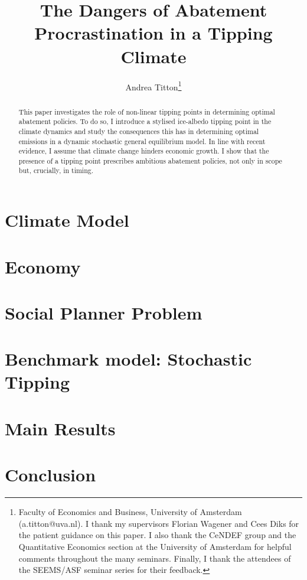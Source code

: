 \documentclass[11pt]{article}
\author{Andrea Titton\thanks{
      Faculty of Economics and Business, University of Amsterdam (a.titton@uva.nl). I thank my supervisors Florian Wagener and Cees Diks for the patient guidance on this paper. I also thank the CeNDEF group and the Quantitative Economics section at the University of Amsterdam for helpful comments throughout the many seminars. Finally, I thank the attendees of the SEEMS/ASF seminar series for their feedback.
    }}
\title{The Dangers of Abatement Procrastination in a Tipping Climate}
\begin{document}
\maketitle

\begin{abstract}
  This paper investigates the role of non-linear tipping points in determining optimal abatement policies. To do so, I introduce a stylised ice-albedo tipping point in the climate dynamics and study the consequences this has in determining optimal emissions in a dynamic stochastic general equilibrium model. In line with recent evidence, I assume that climate change hinders economic growth. I show that the presence of a tipping point prescribes ambitious abatement policies, not only in scope but, crucially, in timing.
\end{abstract}

\newpage


\section{Climate Model}



\section{Economy}




\section{Social Planner Problem}



\section{Benchmark model: Stochastic Tipping}



\section{Main Results}



\section{Conclusion}
\end{document}
